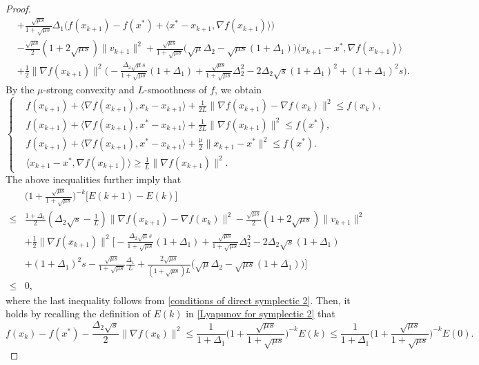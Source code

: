 \documentclass[11pt]{article}
\newcommand{\1}{\mathbf 1}
\numberwithin{equation}{section}
\begin{document}
\begin{proof}
\begin{align*}
        &+\frac{\sqrt{\mu s}}{1+\sqrt{\mu s}}\Delta_1 \big( f(x_{k+1})-f(x^*)+\langle x^*-x_{k+1},\nabla f(x_{k+1})\rangle \big)\\
        &-\frac{\sqrt{\mu s}}{2}(1+2\sqrt{\mu s})\|v_{k+1}\|^2 + \frac{\sqrt{\mu s}}{1+\sqrt{\mu s}}\big(\sqrt{\mu}\Delta_2-\sqrt{\mu s}(1+\Delta_1)\big)\langle x_{k+1}-x^*, \nabla f(x_{k+1})\rangle\\
        &+\frac{1}{2}\|\nabla f(x_{k+1})\|^2\big(-\frac{\Delta_2\sqrt{\mu}s}{1+\sqrt{\mu s}}(1+\Delta_1)+\frac{\sqrt{\mu s}}{1+\sqrt{\mu s}}\Delta_2^2-2\Delta_2\sqrt{s}(1+\Delta_1)^2+(1+\Delta_1)^2s\big).
    \end{align*}
By the $\mu$-strong convexity and $L$-smoothness of $f$, we obtain
    \begin{equation*}
        \left\{
        \begin{aligned}
            &f(x_{k+1})+\langle \nabla f(x_{k+1}),x_k-x_{k+1} \rangle +\frac{1}{2L}\|\nabla f(x_{k+1})-\nabla f(x_k)\|^2 \leqslant f(x_k),\\
            &f(x_{k+1})+\langle \nabla f(x_{k+1}),x^*-x_{k+1}\rangle +\frac{1}{2L}\|\nabla f(x_{k+1})\|^2 \leqslant f(x^*),\\
            &f(x_{k+1})+\langle \nabla f(x_{k+1}),x^*-x_{k+1}\rangle +\frac{\mu}{2}\|x_{k+1}-x^*\|^2 \leqslant
            f(x^*).\\
            &\langle x_{k+1}-x^*, \nabla f(x_{k+1}) \rangle \geqslant \frac{1}{L}\|\nabla f(x_{k+1})\|^2.
        \end{aligned}
        \right.
    \end{equation*}
The above inequalities further imply that 
    \begin{align*}
        &\Big(1+\frac{\sqrt{\mu s}}{1+\sqrt{\mu s}}\Big)^{-k}\big[E(k+1)-E(k)\big]\\
        \leqslant&\frac{1+\Delta_1}{2}(\Delta_2\sqrt{s}-\frac{1}{L})\|\nabla f(x_{k+1})-\nabla f(x_k)\|^2 -\frac{\sqrt{\mu s}}{2}(1+2\sqrt{\mu s})\|v_{k+1}\|^2\\
        &+\frac{1}{2}\|\nabla f(x_{k+1})\|^2
        \Big[-\frac{\Delta_2\sqrt{\mu}s}{1+\sqrt{\mu s}}(1+\Delta_1)+\frac{\sqrt{\mu s}}{1+\sqrt{\mu s}}\Delta_2^2-2\Delta_2\sqrt{s}(1+\Delta_1)\\
        &+(1+\Delta_1)^2s-\frac{\sqrt{\mu s}}{1+\sqrt{\mu s}}\frac{\Delta_1}{L}+\frac{2\sqrt{\mu s}}{(1+\sqrt{\mu s})L}\big(\sqrt{\mu}\Delta_2-\sqrt{\mu s}(1+\Delta_1)\big)\Big]\\
        \leqslant & 0,
    \end{align*}
where the last inequality follows from \eqref{conditions of direct symplectic 2}. 
Then, it holds by recalling the definition of $E(k)$ in \eqref{Lyapunov for symplectic 2} that
$$f(x_{k})-f(x^*)-\frac{\Delta_2\sqrt{s}}{2}\|\nabla f(x_k)\|^2\leqslant \frac{1}{1+\Delta_1}\Big(1+\frac{\sqrt{\mu s}}{1+\sqrt{\mu s}}\Big)^{-k}E(k) \leqslant \frac{1}{1+\Delta_1}\Big(1+\frac{\sqrt{\mu s}}{1+\sqrt{\mu s}}\Big)^{-k}E(0).$$



\end{proof}
\end{document}
